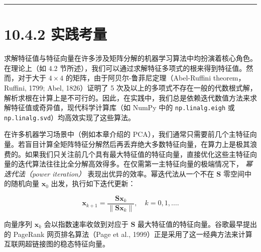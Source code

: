 \medskip\hrule\medskip

\section*{10.4.2 实践考量}

求解特征值与特征向量在许多涉及矩阵分解的机器学习算法中均扮演着核心角色。在理论上（如 4.2 节所述），我们可以通过求解特征多项式的根来得到特征值。然而，对于大于 $ 4 \times 4 $ 的矩阵，由于阿贝尔-鲁菲尼定理（Abel-Ruffini theorem，Ruffini, 1799; Abel, 1826）证明了 5 次及以上的多项式不存在一般的代数根式解，解析求根在计算上是不可行的。因此，在实践中，我们总是依赖迭代数值方法来求解特征值或奇异值，现代科学计算库（如 NumPy 中的 \texttt{np.linalg.eigh} 或 \texttt{np.linalg.svd}）均高效实现了这些算法。

在许多机器学习场景中（例如本章介绍的 PCA），我们通常只需要前几个主特征向量。若盲目计算全矩阵特征分解然后再丢弃绝大多数特征向量，在算力上是极其浪费的。如果我们只关注前几个具有最大特征值的特征向量，直接优化这些主特征向量的迭代算法往往比全分解高效得多。在仅需第一主特征向量的极端情况下， \emph{幂迭代法（power iteration）} 表现出优异的效率。幂迭代法从一个不在 $ \boldsymbol{S} $ 零空间中的随机向量 $ \boldsymbol{x}_0 $ 出发，执行如下迭代更新：

\begin{equation}
\boldsymbol{x}_{k+1} = \frac{\boldsymbol{S}\boldsymbol{x}_k}{\|\boldsymbol{S}\boldsymbol{x}_k\|} , \quad k = 0, 1, \ldots .
\tag{10.52}
\end{equation}

向量序列 $ \boldsymbol{x}_k $ 会以指数速率收敛到对应于 $ \boldsymbol{S} $ 最大特征值的特征向量。谷歌最早提出的 PageRank 网页排名算法（Page et al., 1999）正是采用了这一经典方法来计算互联网超链接图的稳态特征向量。
